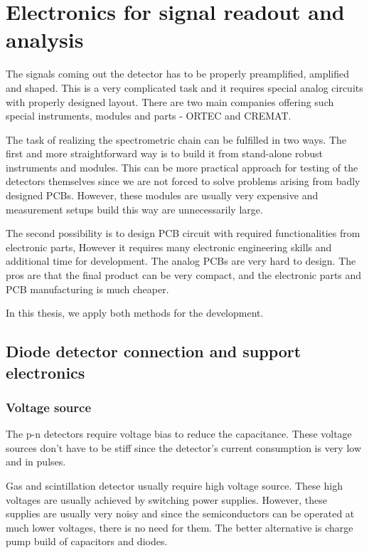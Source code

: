 
\chapter{Electronics for signal readout and analysis}
The signals coming out the detector has to be properly preamplified, amplified and shaped. This is a very complicated task and it requires special analog circuits with properly designed layout. 
There are two main companies offering such special instruments, modules and parts - ORTEC and CREMAT.
\par
The task of realizing the spectrometric chain can be fulfilled in two ways. The first and more straightforward way is to build it from stand-alone robust instruments and modules. This can be more practical approach for testing of the detectors themselves since we are not forced to solve problems arising from badly designed PCBs. However, these modules are usually very expensive and measurement setups build this way are unnecessarily large.
\par
The second possibility is to design PCB circuit with required functionalities from electronic parts, However it requires many electronic engineering skills and additional time for development. The analog PCBs are very hard to design. The pros are that the final product can be very compact, and the electronic parts and PCB manufacturing is much cheaper. 
\par
In this thesis, we apply both methods for the development.



\section{Diode detector connection and support electronics}
\subsection{Voltage source}
The p-n detectors require voltage bias to reduce the capacitance.
These voltage sources don't have to be stiff since the detector's current consumption is very low and in pulses.
\par
Gas and scintillation detector usually require high voltage source. These high voltages are usually achieved by switching power supplies.
However, these supplies are usually very noisy and since the semiconductors can be operated at much lower voltages, there is no need for them. The better alternative is charge pump build of capacitors and diodes.
